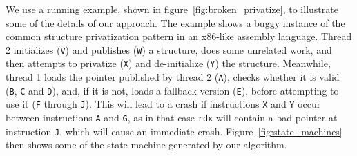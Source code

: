 \documentclass[10pt,twocolumn,preprint,natbib,authoryear]{sigplanconf}
\begin{document}
\begin{figure*}[t]
\caption{State machines produced for the example program}
\label{fig:state_machines}
\end{figure*}

We use a running example, shown in figure~\ref{fig:broken_privatize},
to illustrate some of the details of our approach.  The example shows
a buggy instance of the common structure privatization pattern in an
x86-like assembly language.  Thread 2 initializes (\verb|V|) and
publishes (\verb|W|) a structure, does some unrelated work, and then
attempts to privatize (\verb|X|) and de-initialize (\verb|Y|) the
structure.  Meanwhile, thread 1 loads the pointer published by thread
2 (\verb|A|), checks whether it is valid (\verb|B|, \verb|C| and
\verb|D|), and, if it is not, loads a fallback version (\verb|E|),
before attempting to use it (\verb|F| through \verb|J|).  This will
lead to a crash if instructions \verb|X| and \verb|Y| occur between
instructions \verb|A| and \verb|G|, as in that case \verb|rdx| will
contain a bad pointer at instruction \verb|J|, which will cause an
immediate crash.  Figure~\ref{fig:state_machines} then shows some of
the state machine generated by our algorithm.
\end{document}
